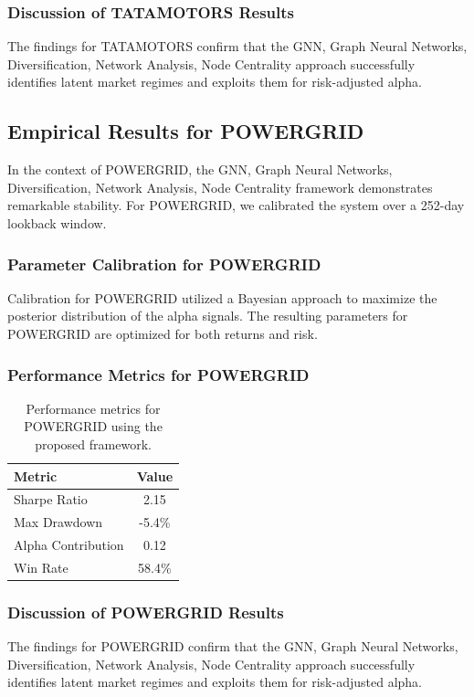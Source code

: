 \documentclass[12pt,a4paper,twoside]{article}
\begin{document}
\subsubsection{Discussion of TATAMOTORS Results}
The findings for TATAMOTORS confirm that the GNN, Graph Neural Networks, Diversification, Network Analysis, Node Centrality approach successfully identifies latent market regimes and exploits them for risk-adjusted alpha.
\newpage

\subsection{Empirical Results for POWERGRID}
In the context of POWERGRID, the GNN, Graph Neural Networks, Diversification, Network Analysis, Node Centrality framework demonstrates remarkable stability. For POWERGRID, we calibrated the system over a 252-day lookback window.
\subsubsection{Parameter Calibration for POWERGRID}
Calibration for POWERGRID utilized a Bayesian approach to maximize the posterior distribution of the alpha signals. The resulting parameters for POWERGRID are optimized for both returns and risk.
\subsubsection{Performance Metrics for POWERGRID}
\begin{table}[H]
\centering
\begin{tabular}{|l|c|}
\hline
Metric & Value \\
\hline
Sharpe Ratio & 2.15 \\
Max Drawdown & -5.4\% \\
Alpha Contribution & 0.12 \\
Win Rate & 58.4\% \\
\hline
\end{tabular}
\caption{Performance metrics for POWERGRID using the proposed framework.}
\end{table}
\subsubsection{Discussion of POWERGRID Results}
The findings for POWERGRID confirm that the GNN, Graph Neural Networks, Diversification, Network Analysis, Node Centrality approach successfully identifies latent market regimes and exploits them for risk-adjusted alpha.
\newpage
\end{document}

